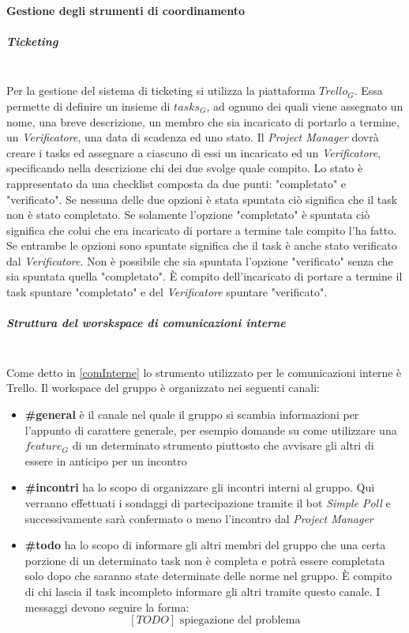 		\paragraph{Gestione degli strumenti di coordinamento}
			\subparagraph{Ticketing} \mbox{} \\
			Per la gestione del sistema di ticketing si utilizza la piattaforma $Trello_G$. Essa permette di definire un insieme di $tasks_G$, ad ognuno dei quali viene assegnato un nome, una breve descrizione, un membro che sia incaricato di portarlo a termine, un \emph{Verificatore}, una data di scadenza ed uno stato. Il \emph{Project Manager} dovrà creare i tasks ed assegnare a ciascuno di essi un incaricato ed un \emph{Verificatore}, specificando nella descrizione chi dei due svolge quale compito. Lo stato è rappresentato da una checklist composta da due punti: "completato" e "verificato". Se nessuna delle due opzioni è stata spuntata ciò significa che il task non è stato completato. Se solamente l'opzione "completato" è spuntata ciò significa che colui che era incaricato di portare a termine tale compito l'ha fatto. Se entrambe le opzioni sono spuntate significa che il task è anche stato verificato dal \emph{Verificatore}. Non è possibile che sia spuntata l'opzione "verificato" senza che sia spuntata quella "completato". È compito dell'incaricato di portare a termine il task spuntare "completato" e del \emph{Verificatore} spuntare "verificato".
			\subparagraph{Struttura del worskspace di comunicazioni interne} \mbox{} \\
			Come detto in \ref{comInterne} lo strumento utilizzato per le comunicazioni interne è Trello. Il workspace del gruppo è organizzato nei seguenti canali:
			\begin{itemize}
				\item \textbf{\#general} è il canale nel quale il gruppo si scambia informazioni per l'appunto di carattere generale, per esempio domande su come utilizzare una $feature_G$ di un determinato strumento piuttosto che avvisare gli altri di essere in anticipo per un incontro
				\item \textbf{\#incontri} ha lo scopo di organizzare gli incontri interni al gruppo. Qui verranno effettuati i sondaggi di partecipazione tramite il bot \emph{Simple Poll} e successivamente sarà confermato o meno l'incontro dal \emph{Project Manager}
				\item \textbf{\#todo} ha lo scopo di informare gli altri membri del gruppo che una certa porzione di un determinato task non è completa e potrà essere completata solo dopo che saranno state determinate delle norme nel gruppo. È compito di chi lascia il task incompleto informare gli altri tramite questo canale. I messaggi devono seguire la forma:
						$$[TODO]\text{ spiegazione del problema}$$
			\end{itemize}
			
